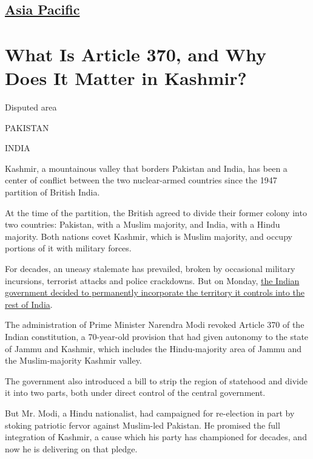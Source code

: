 \hypertarget{-asia-pacific-}{%
\subsection{\texorpdfstring{ \href{/section/world/asia}{Asia Pacific}
}{ Asia Pacific }}\label{-asia-pacific-}}

\hypertarget{what-is-article-370-and-why-does-it-matter-in-kashmir}{%
\section{What Is Article 370, and Why Does It Matter in
Kashmir?}\label{what-is-article-370-and-why-does-it-matter-in-kashmir}}

Disputed area

PAKISTAN

INDIA

Kashmir, a mountainous valley that borders Pakistan and India, has been
a center of conflict between the two nuclear-armed countries since the
1947 partition of British India.

At the time of the partition, the British agreed to divide their former
colony into two countries: Pakistan, with a Muslim majority, and India,
with a Hindu majority. Both nations covet Kashmir, which is Muslim
majority, and occupy portions of it with military forces.

For decades, an uneasy stalemate has prevailed, broken by occasional
military incursions, terrorist attacks and police crackdowns. But on
Monday,
\href{https://www.nytimes.com/2019/08/05/world/asia/india-pakistan-kashmir-jammu.html}{the
Indian government decided to permanently incorporate the territory it
controls into the rest of India}.

The administration of Prime Minister Narendra Modi revoked Article 370
of the Indian constitution, a 70-year-old provision that had given
autonomy to the state of Jammu and Kashmir, which includes the
Hindu-majority area of Jammu and the Muslim-majority Kashmir valley.

The government also introduced a bill to strip the region of statehood
and divide it into two parts, both under direct control of the central
government.

But Mr. Modi, a Hindu nationalist, had campaigned for re-election in
part by stoking patriotic fervor against Muslim-led Pakistan. He
promised the full integration of Kashmir, a cause which his party has
championed for decades, and now he is delivering on that pledge.

